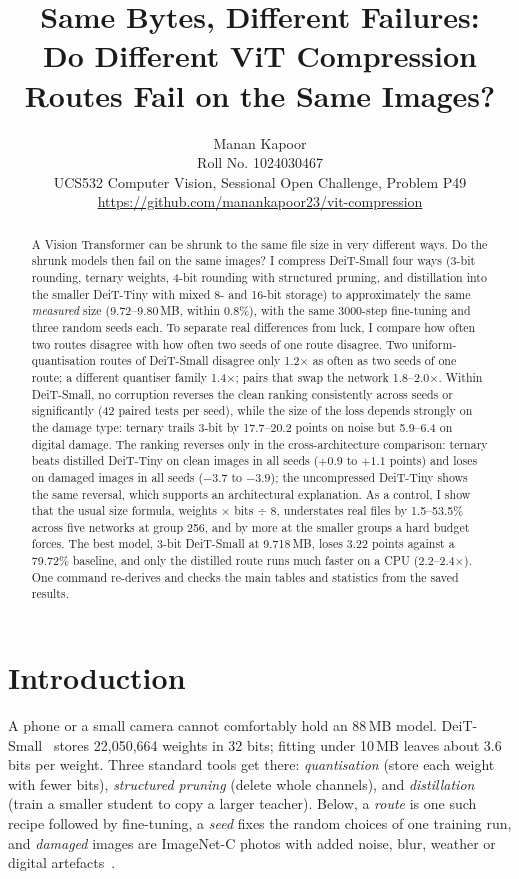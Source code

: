 \documentclass[10pt,twocolumn,letterpaper]{article}
\title{Same Bytes, Different Failures:\\Do Different ViT Compression Routes Fail on the Same Images?}
\author{Manan Kapoor\\
Roll No. 1024030467\\
UCS532 Computer Vision, Sessional Open Challenge, Problem P49\\
{\small\url{https://github.com/manankapoor23/vit-compression}}}
\begin{document}
\maketitle

\begin{abstract}
A Vision Transformer can be shrunk to the same file size in very different ways. Do the shrunk models then fail on the same images? I compress DeiT-Small four ways (3-bit rounding, ternary weights, 4-bit rounding with structured pruning, and distillation into the smaller DeiT-Tiny with mixed 8- and 16-bit storage) to approximately the same \emph{measured} size (9.72--9.80\,MB, within 0.8\%), with the same 3000-step fine-tuning and three random seeds each. To separate real differences from luck, I compare how often two routes disagree with how often two seeds of one route disagree. Two uniform-quantisation routes of DeiT-Small disagree only 1.2$\times$ as often as two seeds of one route; a different quantiser family 1.4$\times$; pairs that swap the network 1.8--2.0$\times$. Within DeiT-Small, no corruption reverses the clean ranking consistently across seeds or significantly (42 paired tests per seed), while the size of the loss depends strongly on the damage type: ternary trails 3-bit by 17.7--20.2 points on noise but 5.9--6.4 on digital damage. The ranking reverses only in the cross-architecture comparison: ternary beats distilled DeiT-Tiny on clean images in all seeds ($+0.9$ to $+1.1$ points) and loses on damaged images in all seeds ($-3.7$ to $-3.9$); the uncompressed DeiT-Tiny shows the same reversal, which supports an architectural explanation. As a control, I show that the usual size formula, weights $\times$ bits $\div$ 8, understates real files by 1.5--53.5\% across five networks at group 256, and by more at the smaller groups a hard budget forces. The best model, 3-bit DeiT-Small at 9.718\,MB, loses 3.22 points against a 79.72\% baseline, and only the distilled route runs much faster on a CPU (2.2--2.4$\times$). One command re-derives and checks the main tables and statistics from the saved results.
\end{abstract}

\section{Introduction}
\label{sec:intro}
A phone or a small camera cannot comfortably hold an 88\,MB model. DeiT-Small~\cite{touvron2021deit} stores 22,050,664 weights in 32 bits; fitting under 10\,MB leaves about 3.6 bits per weight. Three standard tools get there: \emph{quantisation} (store each weight with fewer bits), \emph{structured pruning} (delete whole channels), and \emph{distillation} (train a smaller student to copy a larger teacher). Below, a \emph{route} is one such recipe followed by fine-tuning, a \emph{seed} fixes the random choices of one training run, and \emph{damaged} images are ImageNet-C photos with added noise, blur, weather or digital artefacts~\cite{hendrycks2019benchmarking}.
\end{document}

